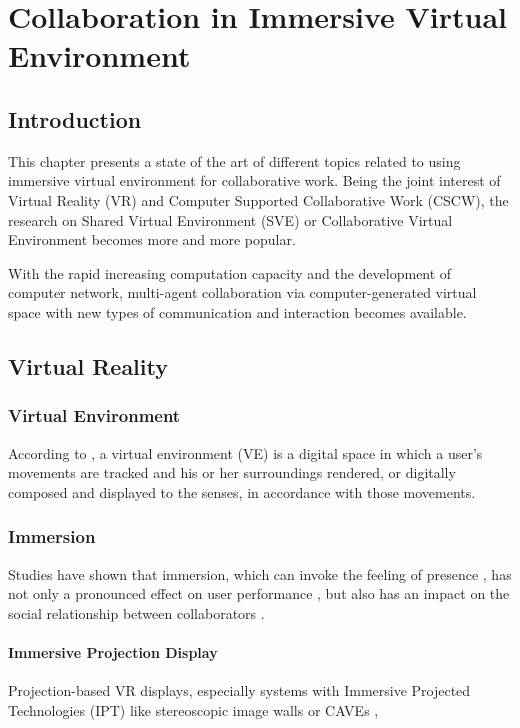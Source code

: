 \chapter{Collaboration in Immersive Virtual Environment}
\label{chapter:context}
\minitoc

\section{Introduction}
This chapter presents a state of the art of different topics related to using immersive virtual environment for collaborative work. Being the joint interest of Virtual Reality (VR) and Computer Supported Collaborative Work (CSCW), the research on Shared Virtual Environment (SVE) or Collaborative Virtual Environment becomes more and more popular.

With the rapid increasing computation capacity and the development of computer network, multi-agent collaboration via computer-generated virtual space with new types of communication and interaction becomes available.

\section{Virtual Reality}

\subsection{Virtual Environment}
According to \citet{Fox2009Guide}, a virtual environment (VE) is a digital space in which a user's movements are tracked and his or her surroundings rendered, or digitally composed and displayed to the senses, in accordance with those movements.


\subsection{Immersion}
Studies have shown that immersion, which can invoke the feeling of presence \citep{Slater1994DepthPre}, has not only a pronounced effect on user performance \citep{Dangelo2008Benefits}, but also has an impact on the social relationship between collaborators \citep{Slater2000Small}.




\subsubsection{Immersive Projection Display}
Projection-based VR displays, especially systems with Immersive Projected Technologies (IPT) like stereoscopic image walls or CAVEs \citep{CruzNeira1993SPV}, 



